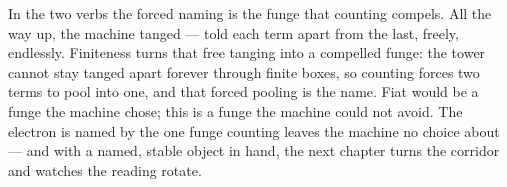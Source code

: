 In the two verbs the forced naming is the funge that counting compels. All the way up, the machine tanged --- told each
term apart from the last, freely, endlessly. Finiteness turns that free tanging into a compelled funge: the tower cannot
stay tanged apart forever through finite boxes, so counting forces two terms to pool into one, and that forced pooling is
the name. Fiat would be a funge the machine chose; this is a funge the machine could not avoid. The electron is named by
the one funge counting leaves the machine no choice about --- and with a named, stable object in hand, the next chapter
turns the corridor and watches the reading rotate.
